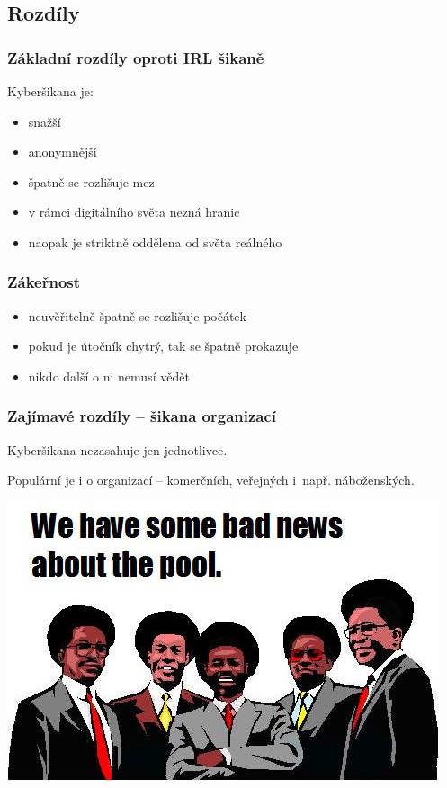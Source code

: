 \documentclass[xetex]{beamer}
\begin{document}
\subsection{Rozdíly}

\begin{frame}
 \frametitle{Základní rozdíly oproti IRL šikaně}
 Kyberšikana je:
 \begin{itemize} 
		\item snažší
		\item anonymnější
		\item špatně se rozlišuje mez
		\item v rámci digitálního světa nezná hranic
		\item naopak je striktně oddělena od světa reálného
 \end{itemize}
\end{frame}

\begin{frame}
	\frametitle{Zákeřnost}
	\begin{itemize}
		\item neuvěřitelně špatně se rozlišuje počátek
		\item pokud je útočník chytrý, tak se špatně prokazuje
		\item nikdo další o ni nemusí vědět
	\end{itemize}
\end{frame}

\begin{frame}
	\frametitle{Zajímavé rozdíly – šikana organizací}

	Kyberšikana nezasahuje jen jednotlivce.

	\bigskip

	Populární je i o organizací – komerčních, veřejných i~např. náboženských.
\end{frame}

\begin{frame}
	\includegraphics[scale=0.6]{announce.jpg}
\end{frame}
\end{document}
